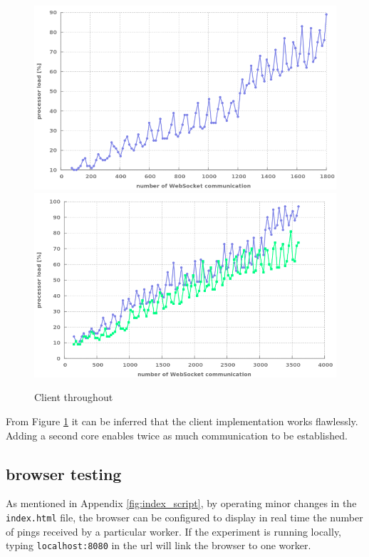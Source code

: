 \begin{figure}[H]
	\centering
		\includegraphics[width=\textwidth]{./Figures/1_client.png}
		\includegraphics[width=\textwidth]{./Figures/2_client.png}
	\caption[Client throughout]{Client throughout}
	\label{fig:1+2_client}
\end{figure}


From Figure \ref{fig:1+2_client} it can be inferred that the client
implementation works flawlessly. Adding a second core enables twice as much
communication  to be established.

\subsection{browser testing}

As mentioned in Appendix \ref{fig:index_script}, by operating minor changes in
the \texttt{index.html} file, the browser can be configured to display in real
time the number of pings received by a particular worker. If the experiment is
running locally, typing \texttt{localhost:8080} in the url will link the
browser to one worker.

